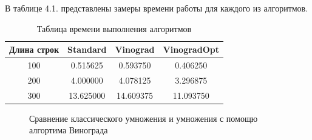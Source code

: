 \documentclass[12pt]{report}
\begin{document}
В таблице 4.1. представлены замеры времени работы для каждого из алгоритмов.

\begin{table} [h!]
	\caption{Таблица времени выполнения алгоритмов}
	\begin{center}
		\begin{tabular}{|c c c c|} 
		 	\hline
			Длина строк & Standard & Vinograd & VinogradOpt \\  
		 	\hline
		 	100 & 0.515625 & 0.593750 & 0.406250 \\
		 	\hline
		 	200 & 4.000000 & 4.078125 & 3.296875 \\
		 	\hline
			300 & 13.625000 & 14.609375 & 11.093750 \\
			\hline
		\end{tabular}
	\end{center}
\end{table}

\begin{figure}[h!]
	\begin{center}
	\end{center}
	\caption{Сравнение классического умножения и умножения с помощю алгортима Винограда}
\end{figure}
\end{document}
